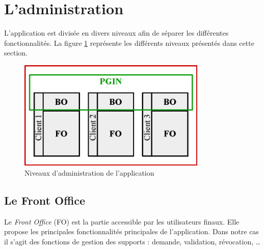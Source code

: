 
\section{L'administration}

L'application est divisée en divers niveaux afin de séparer les différentes fonctionnalités.
La figure \ref{niveaux_administration} représente les différents niveaux présentés dans cette section.
\begin{figure}[!h]
	\center
	\includegraphics[width=0.8\textwidth]{img/niveaux_administration.png}
	\caption{Niveaux d'administration de l'application}
	\label{niveaux_administration}
\end{figure}


\subsection{Le Front Office}

Le \textit{Front Office} (FO) est la partie accessible par les utilisateurs finaux.
Elle propose les principales fonctionnalités principales de l'application.
Dans notre cas il s'agit des fonctions de gestion des supports : demande, validation, révocation, \ldots


